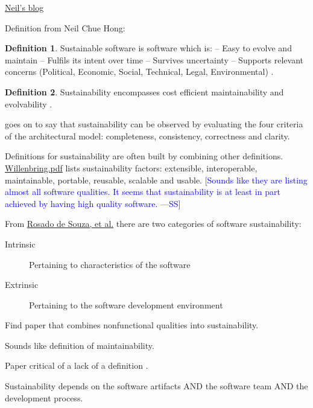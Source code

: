 \documentclass[letterpaper, cleveref]{lipics-v2019}
\newcommand{\authornote}[3]{\textcolor{#1}{[#3 ---#2]}}
\newcommand{\authornote}[3]{}
\newcommand{\wss}[1]{\authornote{blue}{SS}{#1}} %
\theoremstyle{definition}
\newtheorem{defn}{Definition}
\begin{document}
\href{https://www.software.ac.uk/blog/2019-09-12-making-open-source-research-software-visible-path-better-sustainability}
{Neil's blog}

Definition from Neil Chue Hong:
\begin{defn}
	Sustainable software is software which is:
	-- Easy to evolve and maintain
	-- Fulfils its intent over time
	-- Survives uncertainty
	-- Supports relevant concerns (Political, Economic, Social, Technical,
	Legal, Environmental) \citep{Katz2016}.
\end{defn}

\begin{defn}
Sustainability encompasses cost efficient maintainability and evolvability
\citep{SehestedtEtAl2014}.
\end{defn}

\citet{SehestedtEtAl2014} goes on to say that sustainability can be observed
by evaluating the four criteria of the architectural model: completeness,
consistency, correctness and clarity.

Definitions for sustainability are often built by combining other definitions.
\href{https://collegeville.github.io/CW3S19/WorkshopResources/Presentations/1-4-2019CollegevilleWorkshopWillenbring.pdf}
{Willenbring.pdf}
lists sustainability factors: extensible, interoperable, maintainable,
portable, reusable, scalable and usable.  \wss{Sounds like they are listing
almost all software qualities.  It seems that sustainability is at least in
part achieved by having high quality software.}

From
\href{https://figshare.com/articles/Defining_Sustainability_through_Developers_Eyes_Recommendations_from_an_Interview_Study/1111925/1}
{Rosado de Souza, et al.} there are two categories of software sustainability:

\begin{description}
\item[Intrinsic] Pertaining to characteristics of the software
\item[Extrinsic] Pertaining to the software development environment
\end{description}

Find paper that combines nonfunctional qualities into sustainability.

Sounds like definition of maintainability.

Paper critical of a lack of a definition \citep{VentersEtAl2014}.

Sustainability depends on the software artifacts AND the software team AND the
development process.
\end{document}
